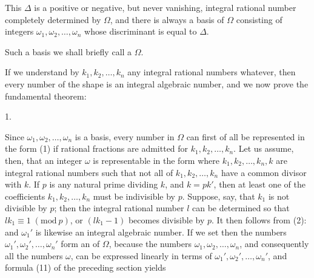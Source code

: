 This $\varDelta$ is a positive or negative, but never vanishing, integral rational number completely determined by $\Omega$, and there is always a basis of $\Omega$ consisting of integers $\omega_1, \omega_2, \ldots, \omega_n$ whose discriminant is equal to $\varDelta$.

Such a basis we shall briefly call a  $\Omega$.

If we understand by $k_1, k_2, \ldots, k_n$ any integral rational numbers whatever, then every number of the shape
is an integral algebraic number, and we now prove the fundamental theorem:

1. 

Since $\omega_1, \omega_2, \ldots, \omega_n$ is a basis, every number in $\Omega$ can first of all be represented in the form (1) if rational fractions are admitted for $k_1, k_2, \ldots, k_n$. Let us assume, then, that an integer $\omega$ is representable in the form
where $k_1, k_2, \ldots, k_n, k$ are integral rational numbers such that not all of $k_1, k_2, \ldots, k_n$ have a common divisor with $k$. If $p$ is any natural prime dividing $k$, and $k = pk'$, then at least one of the coefficients $k_1, k_2, \ldots, k_n$ must be indivisible by $p$. Suppose, say, that $k_1$ is not divisible by $p$; then the integral rational number $l$ can be determined so that $l k_1 \equiv 1 \; (\mathrm{mod}\ p)$, or $(l k_1 - 1)$ becomes divisible by $p$. It then follows from (2):
and $\omega_1'$ is likewise an integral algebraic number. If we set
then the numbers $\omega_1', \omega_2', \ldots, \omega_n'$ form an  of $\Omega$, because the numbers $\omega_1, \omega_2, \ldots, \omega_n$, and consequently all the numbers $\omega$, can be expressed linearly in terms of $\omega_1', \omega_2', \ldots, \omega_n'$, and formula (11) of the preceding section yields
